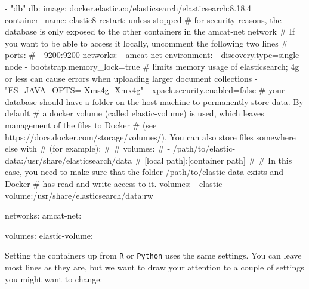 \documentclass[
  letterpaper,
  DIV=11,
  numbers=noendperiod]{scrreprt}
\newenvironment{Shaded}{\begin{snugshade}}{\end{snugshade}}
\newcommand{\CommentTok}[1]{\textcolor[rgb]{0.37,0.37,0.37}{#1}}
\newcommand{\ExtensionTok}[1]{\textcolor[rgb]{0.00,0.23,0.31}{#1}}
\newcommand{\NormalTok}[1]{\textcolor[rgb]{0.00,0.23,0.31}{#1}}
\newcommand{\StringTok}[1]{\textcolor[rgb]{0.13,0.47,0.30}{#1}}
\begin{document}
\begin{tcolorbox}
\begin{Shaded}
\begin{Highlighting}[numbers=left,,]
      \ExtensionTok{{-}} \StringTok{"db"}
  \ExtensionTok{db:}
    \ExtensionTok{image:}\NormalTok{ docker.elastic.co/elasticsearch/elasticsearch:8.18.4}
    \ExtensionTok{container\_name:}\NormalTok{ elastic8}
    \ExtensionTok{restart:}\NormalTok{ unless{-}stopped}
    \CommentTok{\# for security reasons, the database is only exposed to the other containers in the amcat{-}net network}
    \CommentTok{\# If you want to be able to access it locally, uncomment the following two lines}
    \CommentTok{\# ports:}
    \CommentTok{\# {-} 9200:9200}
    \ExtensionTok{networks:}
      \ExtensionTok{{-}}\NormalTok{ amcat{-}net}
    \ExtensionTok{environment:}
      \ExtensionTok{{-}}\NormalTok{ discovery.type=single{-}node}
      \ExtensionTok{{-}}\NormalTok{ bootstrap.memory\_lock=true}
      \CommentTok{\# limits memory usage of elasticsearch; 4g or less can cause errors when uploading larger document collections}
      \ExtensionTok{{-}} \StringTok{"ES\_JAVA\_OPTS={-}Xms4g {-}Xmx4g"}
      \ExtensionTok{{-}}\NormalTok{ xpack.security.enabled=false}
    \CommentTok{\# your database should have a folder on the host machine to permanently store data. By default}
    \CommentTok{\# a docker volume (called elastic{-}volume) is used, which leaves management of the files to Docker}
    \CommentTok{\# (see https://docs.docker.com/storage/volumes/). You can also store files somewhere else with}
    \CommentTok{\# (for example):}
    \CommentTok{\#}
    \CommentTok{\# volumes:}
    \CommentTok{\#   {-} /path/to/elastic{-}data:/usr/share/elasticsearch/data \# [local path]:[container path]}
    \CommentTok{\#}
    \CommentTok{\# In this case, you need to make sure that the folder \textasciigrave{}/path/to/elastic{-}data\textasciigrave{} exists and Docker}
    \CommentTok{\# has read and write access to it.}
    \ExtensionTok{volumes:}
      \ExtensionTok{{-}}\NormalTok{ elastic{-}volume:/usr/share/elasticsearch/data:rw}

\ExtensionTok{networks:}
  \ExtensionTok{amcat{-}net:}

\ExtensionTok{volumes:}
     \ExtensionTok{elastic{-}volume:}
\end{Highlighting}
\end{Shaded}

Setting the containers up from \texttt{R} or \texttt{Python} uses the
same settings. You can leave most lines as they are, but we want to draw
your attention to a couple of settings you might want to change:


\end{tcolorbox}
\end{document}
